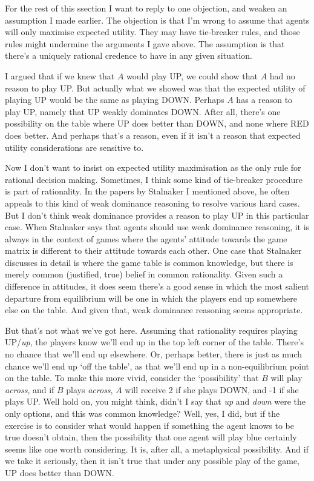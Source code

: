 \documentclass[11pt,]{book}
\begin{document}
For the rest of this ssection I want to reply to one objection, and weaken an assumption I made earlier. The objection is that I'm wrong to assume that agents will only maximise expected utility. They may have tie-breaker rules, and those rules might undermine the arguments I gave above. The assumption is that there's a uniquely rational credence to have in any given situation.

I argued that if we knew that \(A\) would play UP, we could show that \(A\) had no reason to play UP. But actually what we showed was that the expected utility of playing UP would be the same as playing DOWN. Perhaps \(A\) has a reason to play UP, namely that UP weakly dominates DOWN. After all, there's one possibility on the table where UP does better than DOWN, and none where RED does better. And perhaps that's a reason, even if it isn't a reason that expected utility considerations are sensitive to.

Now I don't want to insist on expected utility maximisation as the only rule for rational decision making. Sometimes, I think some kind of tie-breaker procedure is part of rationality. In the papers by Stalnaker I mentioned above, he often appeals to this kind of weak dominance reasoning to resolve various hard cases. But I don't think weak dominance provides a reason to play UP in this particular case. When Stalnaker says that agents should use weak dominance reasoning, it is always in the context of games where the agents' attitude towards the game matrix is different to their attitude towards each other. One case that Stalnaker discusses in detail is where the game table is common knowledge, but there is merely common (justified, true) belief in common rationality. Given such a difference in attitudes, it does seem there's a good sense in which the most salient departure from equilibrium will be one in which the players end up somewhere else on the table. And given that, weak dominance reasoning seems appropriate.

But that's not what we've got here. Assuming that rationality requires playing UP/\emph{up}, the players know we'll end up in the top left corner of the table. There's no chance that we'll end up elsewhere. Or, perhaps better, there is just as much chance we'll end up `off the table', as that we'll end up in a non-equilibrium point on the table. To make this more vivid, consider the `possibility' that \(B\) will play \emph{across}, and if \(B\) plays \emph{across}, \(A\) will receive 2 if she plays DOWN, and -1 if she plays UP. Well hold on, you might think, didn't I say that \emph{up} and \emph{down} were the only options, and this was common knowledge? Well, yes, I did, but if the exercise is to consider what would happen if something the agent knows to be true doesn't obtain, then the possibility that one agent will play blue certainly seems like one worth considering. It is, after all, a metaphysical possibility. And if we take it seriously, then it isn't true that under any possible play of the game, UP does better than DOWN.
\end{document}
